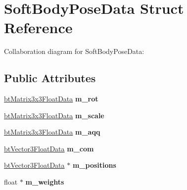 \hypertarget{struct_soft_body_pose_data}{\section{Soft\+Body\+Pose\+Data Struct Reference}
\label{struct_soft_body_pose_data}
}


Collaboration diagram for Soft\+Body\+Pose\+Data\+:
\subsection*{Public Attributes}
\begin{DoxyCompactItemize}
\item 
\hypertarget{struct_soft_body_pose_data_a020a35cfbbe88a92360402e702b7f667}{\hyperlink{structbt_matrix3x3_float_data}{bt\+Matrix3x3\+Float\+Data} {\bfseries m\+\_\+rot}}\label{struct_soft_body_pose_data_a020a35cfbbe88a92360402e702b7f667}

\item 
\hypertarget{struct_soft_body_pose_data_ae1dbbbb74ed103dbb2008661e3042ea7}{\hyperlink{structbt_matrix3x3_float_data}{bt\+Matrix3x3\+Float\+Data} {\bfseries m\+\_\+scale}}\label{struct_soft_body_pose_data_ae1dbbbb74ed103dbb2008661e3042ea7}

\item 
\hypertarget{struct_soft_body_pose_data_add98eba45fb2d041e5de318262cc5826}{\hyperlink{structbt_matrix3x3_float_data}{bt\+Matrix3x3\+Float\+Data} {\bfseries m\+\_\+aqq}}\label{struct_soft_body_pose_data_add98eba45fb2d041e5de318262cc5826}

\item 
\hypertarget{struct_soft_body_pose_data_a2357ae1c8175b5816331d2226af67552}{\hyperlink{structbt_vector3_float_data}{bt\+Vector3\+Float\+Data} {\bfseries m\+\_\+com}}\label{struct_soft_body_pose_data_a2357ae1c8175b5816331d2226af67552}

\item 
\hypertarget{struct_soft_body_pose_data_aae039479a8734b2bef62604e49b1b8da}{\hyperlink{structbt_vector3_float_data}{bt\+Vector3\+Float\+Data} $\ast$ {\bfseries m\+\_\+positions}}\label{struct_soft_body_pose_data_aae039479a8734b2bef62604e49b1b8da}

\item 
\hypertarget{struct_soft_body_pose_data_ae2c54cc1a0a8598ac76ca733ed65e72e}{float $\ast$ {\bfseries m\+\_\+weights}}\label{struct_soft_body_pose_data_ae2c54cc1a0a8598ac76ca733ed65e72e}


\end{DoxyCompactItemize}
